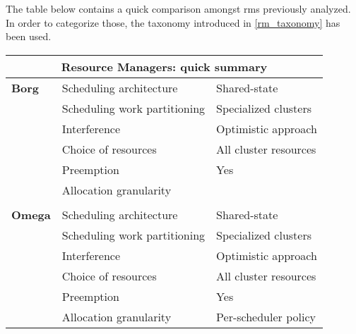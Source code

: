 The table below contains a quick comparison amongst \glspl{rm} previously analyzed.
In order to categorize those, the taxonomy introduced in \autoref{rm_taxonomy} has been used.

\begin{table}[h]
\begin{center}
\begin{tabular}{lll}

\multicolumn{3}{c}{\textbf{Resource Managers: quick summary}} \\ \hline
\multicolumn{1}{l|}{\textbf{Borg \cite{borg}}} 
                                   & Scheduling architecture      & Shared-state            \\ \cline{2-3} 
\multicolumn{1}{l|}{}              & Scheduling work partitioning & Specialized clusters    \\ \cline{2-3} 
\multicolumn{1}{l|}{}              & Interference                 & Optimistic approach     \\ \cline{2-3} 
\multicolumn{1}{l|}{}              & Choice of resources          & All cluster resources   \\ \cline{2-3}  
\multicolumn{1}{l|}{}              & Preemption                   & Yes                     \\ \cline{2-3} 
\multicolumn{1}{l|}{}              & Allocation granularity       &                         \\ \cline{2-3}

\multicolumn{3}{c}{} \\ \hline
\multicolumn{1}{l|}{\textbf{Omega \cite{omega}}} 
                                   & Scheduling architecture      & Shared-state            \\ \cline{2-3} 
\multicolumn{1}{l|}{}              & Scheduling work partitioning & Specialized clusters    \\ \cline{2-3} 
\multicolumn{1}{l|}{}              & Interference                 & Optimistic approach     \\ \cline{2-3} 
\multicolumn{1}{l|}{}              & Choice of resources          & All cluster resources   \\ \cline{2-3} 
\multicolumn{1}{l|}{}              & Preemption                   & Yes                     \\ \cline{2-3} 
\multicolumn{1}{l|}{}              & Allocation granularity       & Per-scheduler policy    \\ \cline{2-3} 


\end{tabular}
\end{center}
\end{table}
